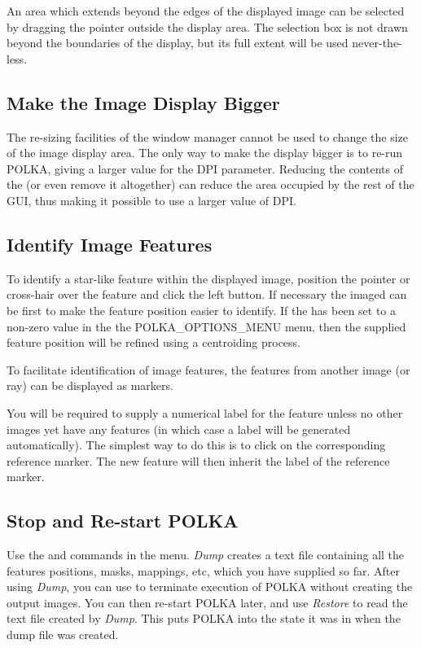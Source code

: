 An area which extends beyond the edges of the displayed image can be
selected by dragging the pointer outside the display area. The selection
box is not drawn beyond the boundaries of the display, but its full extent
will be used never-the-less.

\subsection {Make the Image Display Bigger}
The re-sizing facilities of the window manager cannot be used to change
the size of the image display area. The only way to make the display
bigger is to re-run POLKA, giving a larger value for the
 DPI parameter. Reducing the contents of the
 (or even remove it altogether)
can reduce the area occupied by the rest of the GUI, thus making it
possible to use a larger value of DPI.

\subsection {Identify Image Features}
To identify a star-like feature within the displayed image, position the
pointer or cross-hair over the feature and click the left button. If
necessary the imaged can be  first to make the
feature position easier to identify. If the  has been set to a non-zero value in the
the  {POLKA_OPTIONS_MENU} menu, then the supplied
feature position will be refined using a centroiding process.

To facilitate identification of image features, the features from another
image (or ray) can be displayed as 
markers. 

You will be required to supply a numerical label for the feature unless
no other images yet have any features (in which case a label will be
generated automatically). The simplest way to do this is to click on 
the corresponding reference marker. The new feature will then inherit the
label of the reference marker.

\subsection {Stop and Re-start POLKA}
Use the  and  commands in the  menu. {\em Dump} creates a text file containing 
all the features positions, masks, mappings, etc, which you have supplied so 
far. After using {\em Dump}, you can use 
to terminate execution of POLKA without creating the output images. You
can then re-start POLKA later, and use {\em Restore} to read the text
file created by {\em Dump}. This puts POLKA into the state it was
in  when the dump file was created.

